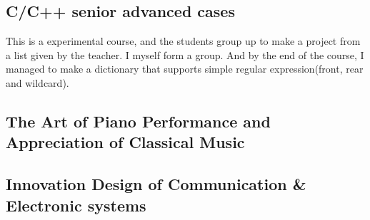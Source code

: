 \subsection{C/C++ senior advanced cases}
This is a experimental course, and the students group up to make a project from a list given by the teacher. I myself form a group. And by the end of the course, I managed to make a dictionary that supports simple regular expression(front, rear and wildcard).

\subsection{The Art of Piano Performance and Appreciation of Classical Music}

\subsection{Innovation Design of Communication \& Electronic systems} 